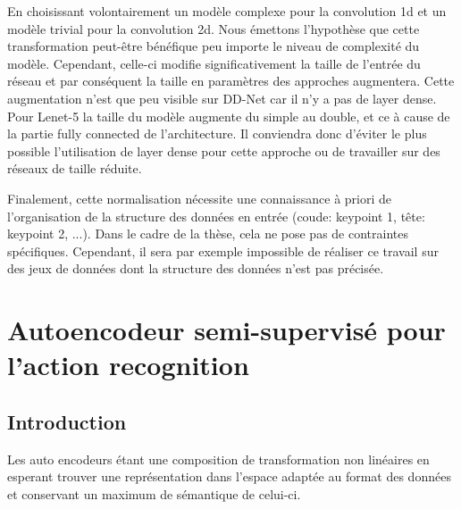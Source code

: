 En choisissant volontairement un modèle complexe pour la convolution 1d et un modèle trivial pour la convolution 2d. Nous émettons l'hypothèse que cette transformation peut-être bénéfique peu importe le niveau de complexité du modèle. Cependant, celle-ci modifie significativement la taille de l'entrée du réseau et par conséquent la taille en paramètres des approches augmentera. Cette augmentation n'est que peu visible sur DD-Net car il n'y a pas de layer dense. Pour Lenet-5 la taille du modèle augmente du simple au double, et ce à cause de la partie fully connected de l'architecture. Il conviendra donc d'éviter le plus possible l'utilisation de layer dense pour cette approche ou de travailler sur des réseaux de taille réduite.

Finalement, cette normalisation nécessite une connaissance à priori de l'organisation de la structure des données en entrée (coude: keypoint 1, tête: keypoint 2, ...). Dans le cadre de la thèse, cela ne pose pas de contraintes spécifiques. Cependant, il sera par exemple impossible de réaliser ce travail sur des jeux de données dont la structure des données n'est pas précisée.

\section{Autoencodeur semi-supervisé pour l'action recognition}
\label{refAEmod}

\subsection{Introduction}
Les auto encodeurs étant une composition de transformation non linéaires en esperant trouver une représentation dans l'espace adaptée au format des données et conservant un maximum de sémantique de celui-ci.

